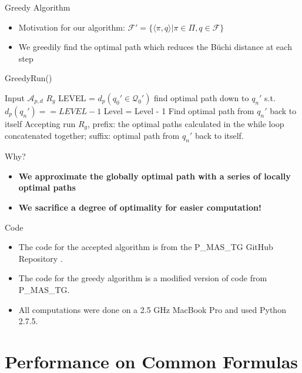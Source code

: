 \documentclass{beamer}
\newcommand{\Q}{\mathcal{Q}}
\newcommand{\A}{\mathcal{A}}
\begin{document}
\begin{frame}{Greedy Algorithm}
\begin{itemize}
\item {
	Motivation for our algorithm: $\mathcal{F}' = \{ \langle \pi, q \rangle | \pi \in \Pi, q \in \mathcal{F}\}$  
}
\item { 
	We greedily find the optimal path which reduces the B\"uchi distance at each step
	}
\end{itemize}
\begin{algorithm}[H]
\caption{GreedyRun()}
\begin{algorithmic}[1]
\Require Input $\A_{p,d}$
\Ensure $R_{g}$
\State LEVEL = $d_p(q_0' \in \Q_0')$
\State find optimal path down to $q_n'$ s.t. $d_p(q_n')==LEVEL-1$
\State Level = Level - 1	
\EndWhile
\State Find optimal path from $q_n'$ back to itself
\State Accepting run $R_{g}$, prefix: the optimal paths calculated in the while loop concatenated together; suffix: optimal path from $q_n'$ back to itself.
\end{algorithmic}
\end{algorithm}

\end{frame}

\begin{frame}{Why?}
\begin{itemize}
\item {
	\Large \textbf{We approximate the globally optimal path with a series of locally optimal paths}
}
\item {
	\Large \textbf{We sacrifice a degree of optimality for easier computation!}
}
\end{itemize}
\end{frame}

\begin{frame}{Code}
\begin{itemize}
\item The code for the accepted algorithm is from the P\_MAS\_TG GitHub Repository \cite{pMasGit}.
\item The code for the greedy algorithm is a modified version of code from P\_MAS\_TG.
\item All computations were done on a 2.5 GHz MacBook Pro and used Python 2.7.5.
\end{itemize}


\end{frame}
\section{Performance on Common Formulas}
\end{document}
